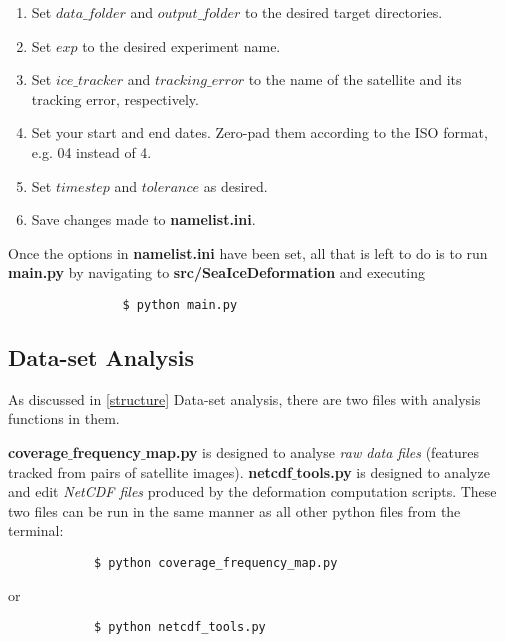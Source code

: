 \documentclass{article}
\begin{document}
            \begin{enumerate}
                \item Set $data\_folder$ and $output\_folder$ to the desired target directories.
                \item Set $exp$ to the desired experiment name.
                \item Set $ice\_tracker$ and $tracking\_error$ to the name of the satellite and its tracking error, respectively.
                \item Set your start and end dates. Zero-pad them according to the ISO format, e.g. 04 instead of 4.
                \item Set $timestep$ and $tolerance$ as desired.
                \item Save changes made to \textbf{namelist.ini}.
            \end{enumerate}

            Once the options in \textbf{namelist.ini} have been set, all that is left to do is to run \textbf{main.py} by navigating to \textbf{src/SeaIceDeformation} and executing

            \begin{verbatim}
                $ python main.py
            \end{verbatim}

    \subsection{Data-set Analysis}

        As discussed in \ref{structure} Data-set analysis, there are two files with analysis functions in them.

        \textbf{coverage$\_$frequency$\_$map.py} is designed to analyse \textit{raw data files} (features tracked from pairs of satellite images). \textbf{netcdf$\_$tools.py} is designed to analyze and edit \textit{NetCDF files} produced by the deformation computation scripts. These two files can be run in the same manner as all other python files from the terminal:

        \begin{verbatim}
            $ python coverage_frequency_map.py
        \end{verbatim}

        or

        \begin{verbatim}
            $ python netcdf_tools.py
        \end{verbatim}
\end{document}
